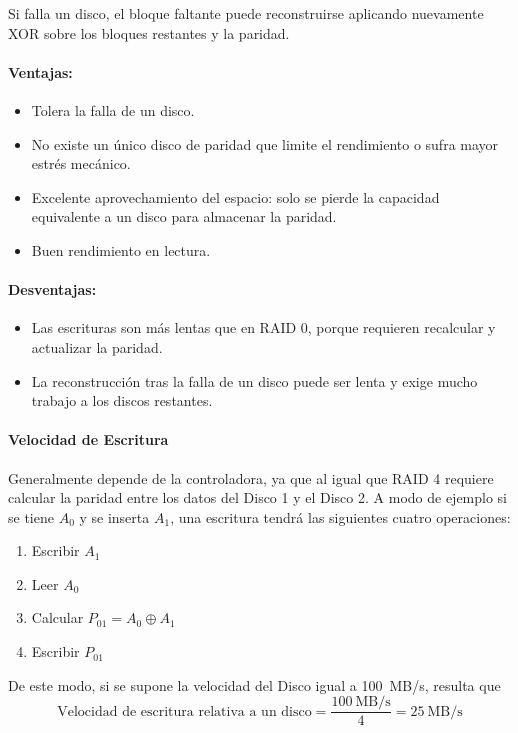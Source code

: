 Si falla un disco, el bloque faltante puede reconstruirse aplicando nuevamente XOR sobre los bloques restantes y la paridad.

\paragraph{Ventajas:}
\begin{itemize}
  \item Tolera la falla de un disco.
  \item No existe un único disco de paridad que limite el rendimiento o sufra mayor estrés mecánico.
  \item Excelente aprovechamiento del espacio: solo se pierde la capacidad equivalente a un disco para almacenar la paridad.
  \item Buen rendimiento en lectura.
\end{itemize}

\paragraph{Desventajas:}
\begin{itemize}
  \item Las escrituras son más lentas que en RAID 0, porque requieren recalcular y actualizar la paridad.
  \item La reconstrucción tras la falla de un disco puede ser lenta y exige mucho trabajo a los discos restantes.
\end{itemize}

\paragraph{Velocidad de Escritura}
Generalmente depende de la controladora, ya que al igual que RAID 4 requiere calcular la paridad entre los datos del Disco 1 y el Disco 2. A modo de ejemplo si se tiene \(A_0\) y se inserta \(A_1\), una escritura tendrá las siguientes cuatro operaciones:
\begin{enumerate}
  \item Escribir \(A_1\)
  \item Leer \(A_0\)
  \item Calcular \(P_{01}=A_0\oplus A_1\)
  \item Escribir \(P_{01}\)
\end{enumerate}

De este modo, si se supone la velocidad del Disco igual a 100~MB/s, resulta que 
\[
  \text{Velocidad de escritura relativa a un disco} = \frac{100~\text{MB/s}}{4} = 25~\text{MB/s}
\]

